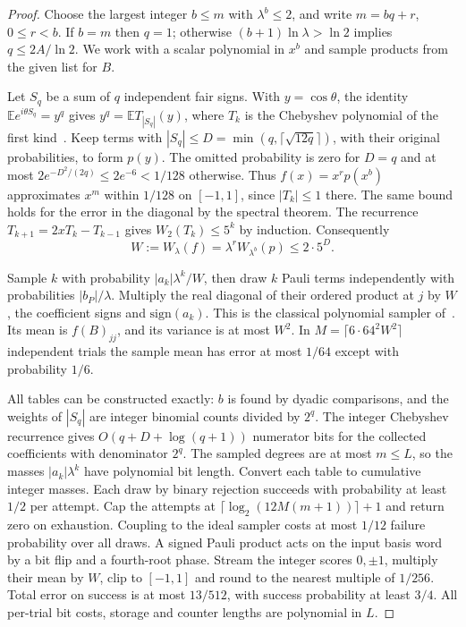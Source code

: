\documentclass[11pt]{article}
\begin{document}
\begin{proof}
Choose the largest integer \(b\le m\) with \(\lambda^b\le2\), and write \(m=bq+r\), \(0\le r<b\). If \(b=m\) then \(q=1\); otherwise \((b+1)\ln\lambda>\ln2\) implies \(q\le 2A/\ln2\). We work with a scalar polynomial in \(x^b\) and sample products from the given list for \(B\).

Let \(S_q\) be a sum of \(q\) independent fair signs. With \(y=\cos\theta\), the identity \(\mathbb E e^{i\theta S_q}=y^q\) gives \(y^q=\mathbb E T_{|S_q|}(y)\), where \(T_k\) is the Chebyshev polynomial of the first kind~\cite[Sec.~3]{sv}. Keep terms with \(|S_q|\le D=\min(q,\lceil\sqrt{12q}\rceil)\), with their original probabilities, to form \(p(y)\). The omitted probability is zero for \(D=q\) and at most \(2e^{-D^2/(2q)}\le2e^{-6}<1/128\) otherwise. Thus \(f(x)=x^r p(x^b)\) approximates \(x^m\) within \(1/128\) on \([-1,1]\), since \(|T_k|\le1\) there. The same bound holds for the error in the diagonal by the spectral theorem. The recurrence \(T_{k+1}=2xT_k-T_{k-1}\) gives \(W_2(T_k)\le5^k\) by induction. Consequently
\[
 W:=W_\lambda(f)=\lambda^r W_{\lambda^b}(p)\le 2\cdot5^D .
\]

Sample \(k\) with probability \(|a_k|\lambda^k/W\), then draw \(k\) Pauli terms independently with probabilities \(|b_P|/\lambda\). Multiply the real diagonal of their ordered product at \(j\) by \(W\), the coefficient signs and \(\mathrm{sign}(a_k)\). This is the classical polynomial sampler of~\cite{wang,cif}. Its mean is \(f(B)_{jj}\), and its variance is at most \(W^2\). In \(M=\lceil6\cdot64^2W^2\rceil\) independent trials the sample mean has error at most \(1/64\) except with probability \(1/6\).

All tables can be constructed exactly: \(b\) is found by dyadic comparisons, and the weights of \(|S_q|\) are integer binomial counts divided by \(2^q\). The integer Chebyshev recurrence gives \(O(q+D+\log(q+1))\) numerator bits for the collected coefficients with denominator \(2^q\). The sampled degrees are at most \(m\le L\), so the masses \(|a_k|\lambda^k\) have polynomial bit length. Convert each table to cumulative integer masses. Each draw by binary rejection succeeds with probability at least \(1/2\) per attempt. Cap the attempts at \(\lceil\log_2(12M(m+1))\rceil+1\) and return zero on exhaustion. Coupling to the ideal sampler costs at most \(1/12\) failure probability over all draws. A signed Pauli product acts on the input basis word by a bit flip and a fourth-root phase. Stream the integer scores \(0,\pm1\), multiply their mean by \(W\), clip to \([-1,1]\) and round to the nearest multiple of \(1/256\). Total error on success is at most \(13/512\), with success probability at least \(3/4\). All per-trial bit costs, storage and counter lengths are polynomial in \(L\).


\end{proof}
\end{document}

